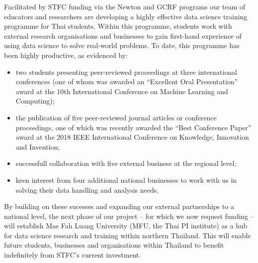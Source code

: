 \documentclass[11pt]{article}
\begin{document}
  \vspace{2mm}
  \noindent
  Facilitated by STFC funding via the Newton and GCRF programs our team of educators and researchers are developing a highly effective data science training programme for Thai students. Within this programme, students work with external research organisations and businesses to gain first-hand experience of using data science to solve real-world problems. To date, this programme has been highly productive, as evidenced by:
  \begin{itemize}[leftmargin=6mm,itemsep=-3pt,topsep=1pt]
    \item two students presenting peer-reviewed proceedings at three international conferences (one of whom was awarded an ``Excellent Oral Presentation'' award at the 10th International Conference on Machine Learning and Computing);
    \item the publication of five peer-reviewed journal articles or conference proceedings, one of which was recently awarded the ``Best Conference Paper'' award at the 2018 IEEE International Conference on Knowledge, Innovation and Invention;
    \item successfull collaboration with five external business at the regional level;
    \item keen interest from four additional national businesses to work with us in solving their data handling and analysis needs.
  \end{itemize}
  By building on these sucesses and expanding our external partnerships to a national level, the next phase of our project -- for which we now request funding -- will establish Mae Fah Luang University (MFU, the Thai PI institute) as a hub for data science research and training within northern Thailand. This will enable future students, businesses and organisations within Thailand to benefit indefinitely from STFC's current investment.
  
\end{document}
